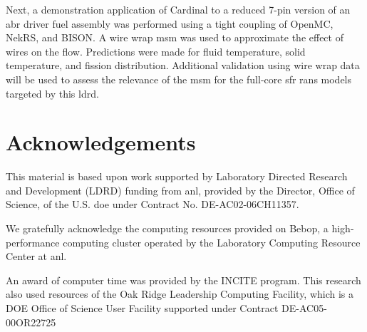 \documentclass[3p,,preprint,11pt]{elsarticle}
\begin{document}
Next, a demonstration application of Cardinal to a reduced 7-pin version of an \gls{abr} driver fuel assembly was performed using a tight coupling of OpenMC, NekRS, and BISON. A wire wrap \gls{msm} was used to approximate the effect of wires on the flow. Predictions were made for fluid temperature, solid temperature, and fission distribution. Additional validation using wire wrap data will be used to assess the relevance of the \gls{msm} for the full-core \gls{sfr} \gls{rans} models targeted by this \gls{ldrd}.

\section*{Acknowledgements}

This material is based upon work supported by Laboratory Directed Research and Development (LDRD) funding from \gls{anl}, provided by the Director, Office of Science, of the U.S. \gls{doe} under Contract No. DE-AC02-06CH11357. 

We gratefully acknowledge the computing resources provided on Bebop, a high-performance computing cluster operated by the Laboratory Computing Resource Center at \gls{anl}.

An award of computer time was provided by the INCITE program. This research also used resources of the Oak Ridge Leadership Computing Facility, which is a DOE Office of Science User Facility supported under Contract DE-AC05-00OR22725

\clearpage
\providecommand*{\phantomsection}{}
\phantomsection
{}


\end{document}

